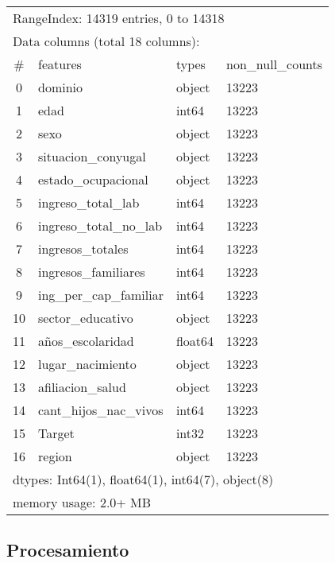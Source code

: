\documentclass[a4paper]{article}
\begin{document}
        \begin{table}[H]
            \centering
            \begin{tabular}{clll}
                \multicolumn{4}{l}{RangeIndex: 14319 entries, 0 to 14318} \\
                \multicolumn{4}{l}{Data columns (total 18 columns):} \\
                \# & features & types & non\_null\_counts \\ \hline
                0 & dominio & object & 13223 \\ 
                1 & edad & int64 & 13223 \\ 
                2 & sexo & object & 13223 \\ 
                3 & situacion\_conyugal & object & 13223 \\ 
                4 & estado\_ocupacional & object & 13223 \\ 
                5 & ingreso\_total\_lab & int64 & 13223 \\ 
                6 & ingreso\_total\_no\_lab & int64 & 13223 \\ 
                7 & ingresos\_totales & int64 & 13223 \\ 
                8 & ingresos\_familiares & int64 & 13223 \\ 
                9 & ing\_per\_cap\_familiar & int64 & 13223 \\ 
                10 & sector\_educativo & object & 13223 \\ 
                11 & años\_escolaridad & float64 & 13223 \\ 
                12 & lugar\_nacimiento & object & 13223 \\ 
                13 & afiliacion\_salud & object & 13223 \\ 
                14 & cant\_hijos\_nac\_vivos & int64 & 13223 \\ 
                15 & Target & int32 & 13223 \\ 
                16 & region & object & 13223 \\ 
                \multicolumn{4}{l}{dtypes: Int64(1), float64(1), int64(7), object(8)} \\
                \multicolumn{4}{l}{memory usage: 2.0+ MB} 
            \end{tabular}
        \end{table}
    \subsection{Procesamiento}
\end{document}
